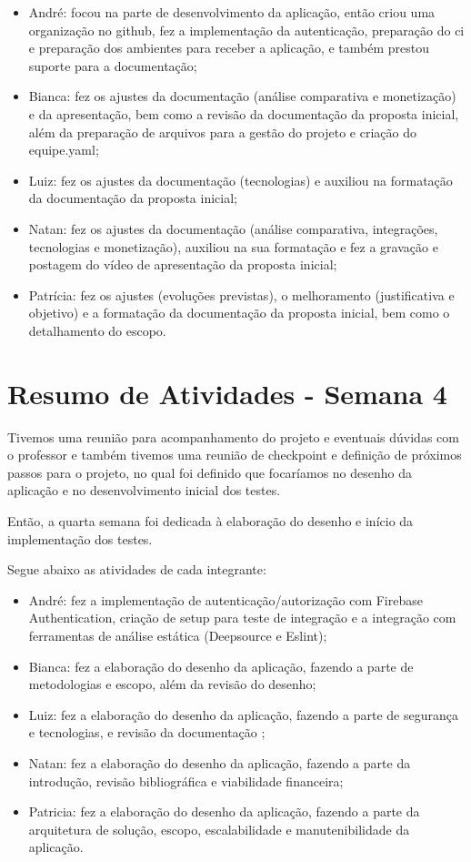 \begin{apendicesenv}
\begin{itemize}
\item André: focou na parte de desenvolvimento da aplicação, então criou uma organização no \gls{github}, fez a implementação da autenticação, preparação do \ac{ci} e preparação dos ambientes para receber a aplicação, e também prestou suporte para a documentação;
\item Bianca: fez os ajustes da documentação (análise comparativa e monetização) e da apresentação, bem como a revisão da documentação da proposta inicial, além da preparação de arquivos para a gestão do projeto e criação do equipe.yaml;
\item Luiz: fez os ajustes da documentação (tecnologias) e auxiliou na formatação da documentação da proposta inicial;
\item Natan: fez os ajustes da documentação (análise comparativa, integrações, tecnologias e monetização), auxiliou na sua formatação e fez a gravação e postagem do vídeo de apresentação da proposta inicial;
\item Patrícia: fez os ajustes (evoluções previstas), o melhoramento (justificativa e objetivo) e a formatação da documentação da proposta inicial, bem como o detalhamento do escopo.
\end{itemize}

\section{Resumo de Atividades - Semana 4}
Tivemos uma reunião para acompanhamento do projeto e eventuais dúvidas com o professor e também tivemos uma reunião de \gls{checkpoint} e definição de próximos passos para o projeto, no qual foi definido que focaríamos no desenho da aplicação e no desenvolvimento inicial dos testes.

Então, a quarta semana foi dedicada à elaboração do desenho e início da implementação dos testes. 

Segue abaixo as atividades de cada integrante:

\begin{itemize}
\item André: fez a implementação de autenticação/autorização com Firebase Authentication, criação de \gls{setup} para teste de integração e a integração com ferramentas de análise estática (Deepsource e Eslint);
\item Bianca: fez a elaboração do desenho da aplicação, fazendo a parte de metodologias e escopo, além da revisão do desenho;
\item Luiz: fez a elaboração do desenho da aplicação, fazendo a parte de segurança e tecnologias, e revisão da documentação ;
\item Natan: fez a elaboração do desenho da aplicação, fazendo a parte da introdução, revisão bibliográfica e viabilidade financeira;
\item Patricia: fez a elaboração do desenho da aplicação, fazendo a parte da arquitetura de solução, escopo, escalabilidade e manutenibilidade da aplicação.
\end{itemize}


\end{apendicesenv}
